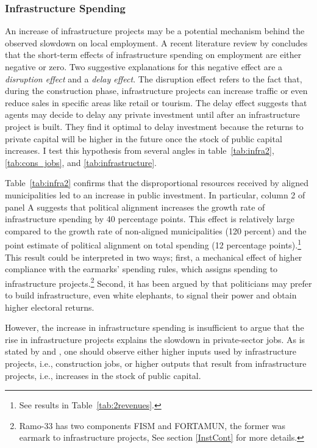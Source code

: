 \documentclass[dv_diss_main.tex]{subfiles}
\begin{document}
\subsubsection{Infrastructure Spending} 
An increase of infrastructure projects may be a potential mechanism behind the observed slowdown on local employment.
A recent literature review by \cite{ramey2020macroeconomic} concludes that the short-term effects of infrastructure spending on employment are either negative or zero. 
Two suggestive explanations for this negative effect are a \textit{disruption effect} and a \textit{delay effect}. The disruption effect refers to the fact that, during the construction phase, infrastructure projects can increase traffic or even reduce sales in specific areas like retail or tourism. 
 The delay effect suggests that agents may decide to delay any private investment until after an infrastructure project is built. They find it optimal to delay investment because the returns to private capital will be higher in the future once the stock of public capital increases. I test this hypothesis from several angles in table~\ref{tab:infra2}, \ref{tab:cons_jobs}, and \ref{tab:infrastructure}. 

Table~\ref{tab:infra2} confirms that the disproportional resources received by aligned municipalities led to an increase in public investment. In particular, column 2 of panel A suggests that political alignment increases the growth rate of infrastructure spending by 40 percentage points. This effect is relatively large compared to the growth rate of non-aligned municipalities (120 percent) and the point estimate of political alignment on total spending (12 percentage points).\footnote{See results in Table~\ref{tab:2revenues}. } This result could be interpreted in two ways; first, a mechanical effect of higher compliance with the earmarks' spending rules, which assigns spending to infrastructure projects.\footnote{Ramo-33 has two components FISM and FORTAMUN, the former was earmark to infrastructure projects, See section \ref{InstCont} for more details.}  Second, it has been argued by \cite{robinson2005white} that politicians may prefer to build infrastructure, even white elephants, to signal their power and obtain higher electoral returns. 

However, the increase in infrastructure spending is insufficient to argue that the rise in infrastructure projects explains the slowdown in private-sector jobs. As is stated by \cite{garin2019putting} and \cite{ramey2020macroeconomic}, one should observe either higher inputs used by infrastructure projects, i.e., construction jobs, or higher outputs that result from infrastructure projects, i.e., increases in the stock of public capital. 
\end{document}
